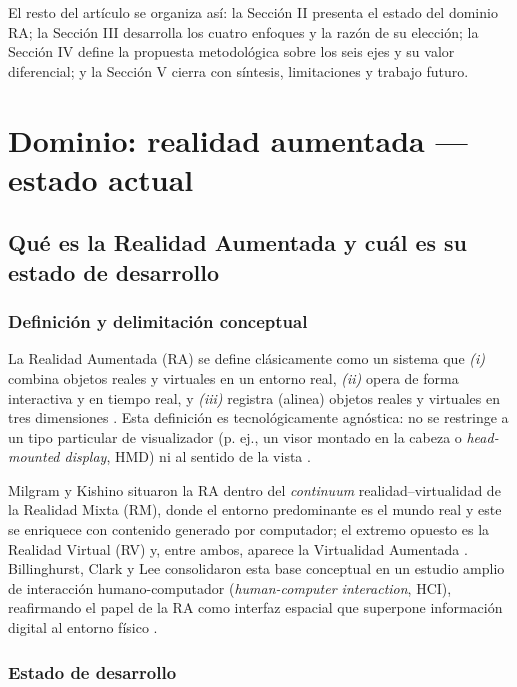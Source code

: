 \documentclass[conference]{IEEEtran}
\begin{document}
El resto del artículo se organiza así: la Sección II presenta el estado del dominio RA; la Sección III desarrolla los cuatro enfoques y la razón de su elección; la Sección IV define la propuesta metodológica sobre los seis ejes y su valor diferencial; y la Sección V cierra con síntesis, limitaciones y trabajo futuro.

\section{Dominio: realidad aumentada — estado actual}

\subsection{Qué es la Realidad Aumentada y cuál es su estado de desarrollo}

\subsubsection{Definición y delimitación conceptual}

La Realidad Aumentada (RA) se define clásicamente como un sistema que \textit{(i)} combina objetos reales y virtuales en un entorno real, \textit{(ii)} opera de forma interactiva y en tiempo real, y \textit{(iii)} registra (alinea) objetos reales y virtuales en tres dimensiones \cite{Azuma1997}. Esta definición es tecnológicamente agnóstica: no se restringe a un tipo particular de visualizador (p. ej., un visor montado en la cabeza o \textit{head-mounted display}, HMD) ni al sentido de la vista \cite{Azuma2001}.

Milgram y Kishino situaron la RA dentro del \textit{continuum} realidad–virtualidad de la Realidad Mixta (RM), donde el entorno predominante es el mundo real y este se enriquece con contenido generado por computador; el extremo opuesto es la Realidad Virtual (RV) y, entre ambos, aparece la Virtualidad Aumentada \cite{Milgram1994}. Billinghurst, Clark y Lee consolidaron esta base conceptual en un estudio amplio de interacción humano-computador (\textit{human-computer interaction}, HCI), reafirmando el papel de la RA como interfaz espacial que superpone información digital al entorno físico \cite{Billinghurst2015}.

\subsubsection{Estado de desarrollo}
\end{document}

